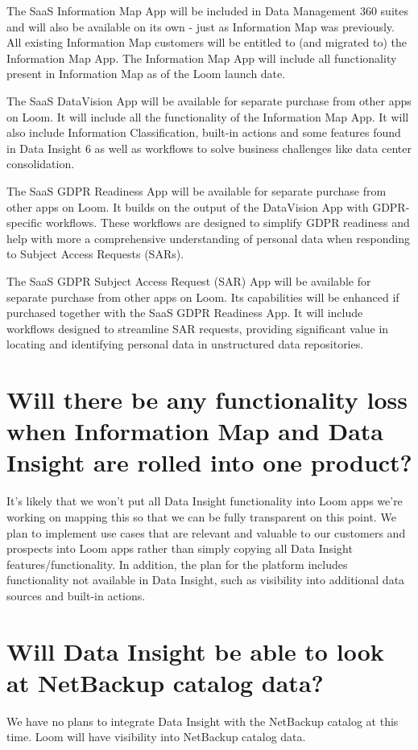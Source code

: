 \documentclass[letterpaper,10pt,english]{sphinxmanual}
\begin{document}
The SaaS Information Map App will be included in Data Management 360 suites and will also be available on its own - just as Information Map was previously. All existing Information Map customers will be entitled to (and migrated to) the Information Map App. The Information Map App will include all functionality present in Information Map as of the Loom launch date.

The SaaS DataVision App will be available for separate purchase from other apps on Loom. It will include all the functionality of the Information Map App. It will also include Information Classification, built-in actions and some features found in Data Insight 6 as well as workflows to solve business challenges like data center consolidation.

The SaaS GDPR Readiness App will be available for separate purchase from other apps on Loom. It builds on the output of the DataVision App with GDPR-specific workflows. These workflows are designed to simplify GDPR readiness and help with more a comprehensive understanding of personal data when responding to Subject Access Requests (SARs).

The SaaS GDPR Subject Access Request (SAR) App will be available for separate purchase from other apps on Loom. Its capabilities will be enhanced if purchased together with the SaaS GDPR Readiness App. It will include workflows designed to streamline SAR requests, providing significant value in locating and identifying personal data in unstructured data repositories.


\section{Will there be any functionality loss when Information Map and Data Insight are rolled into one product?}
\label{\detokenize{loom_trbs_faq:will-there-be-any-functionality-loss-when-information-map-and-data-insight-are-rolled-into-one-product}}
It’s likely that we won’t put all Data Insight functionality into Loom apps \textendash{} we’re working on mapping this so that we can be fully transparent on this point. We plan to implement use cases that are relevant and valuable to our customers and prospects into Loom apps rather than simply copying all Data Insight features/functionality. In addition, the plan for the platform includes functionality not available in Data Insight, such as visibility into additional data sources and built-in actions.


\section{Will Data Insight be able to look at NetBackup catalog data?}
\label{\detokenize{loom_trbs_faq:will-data-insight-be-able-to-look-at-netbackup-catalog-data}}
We have no plans to integrate Data Insight with the NetBackup catalog at this time. Loom will have visibility into NetBackup catalog data.
\end{document}
